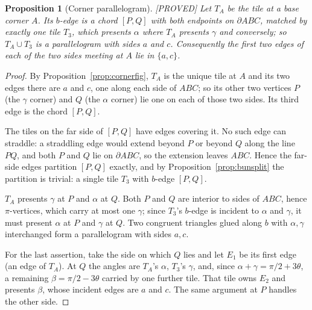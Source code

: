 \documentclass[11pt,reqno]{amsart}
\theoremstyle{plain}
\newtheorem{proposition}[theorem]{Proposition}
\theoremstyle{definition}
\newcommand{\lab}[1]{\hfill\textnormal{\footnotesize\textsc{[#1]}}}
\begin{document}
\begin{proposition}[Corner parallelogram]\label{prop:cornerpara}\lab{PROVED}
Let $T_A$ be the tile at a base corner $A$. Its $b$-edge is a chord $[P,Q]$ with both endpoints on
$\partial ABC$, matched by exactly one tile $T_3$, which presents $\alpha$ where $T_A$ presents
$\gamma$ and conversely; so $T_A\cup T_3$ is a parallelogram with sides $a$ and $c$. Consequently
the first \emph{two} edges of each of the two sides meeting at $A$ lie in $\{a,c\}$.
\end{proposition}

\begin{proof}
By Proposition~\ref{prop:cornerfig}, $T_A$ is the unique tile at $A$ and its two edges there are $a$
and $c$, one along each side of $ABC$; so its other two vertices $P$ (the $\gamma$ corner) and $Q$
(the $\alpha$ corner) lie one on each of those two sides. Its third edge is the chord $[P,Q]$.

The tiles on the far side of $[P,Q]$ have edges covering it. No such edge can straddle: a straddling
edge would extend beyond $P$ or beyond $Q$ along the line $PQ$, and both $P$ and $Q$ lie on
$\partial ABC$, so the extension leaves $ABC$. Hence the far-side edges partition $[P,Q]$ exactly,
and by Proposition~\ref{prop:bunsplit} the partition is trivial: a single tile $T_3$ with $b$-edge
$[P,Q]$.

$T_A$ presents $\gamma$ at $P$ and $\alpha$ at $Q$. Both $P$ and $Q$ are interior to sides of $ABC$,
hence $\pi$-vertices, which carry at most one $\gamma$; since $T_3$'s $b$-edge is incident to
$\alpha$ and $\gamma$, it must present $\alpha$ at $P$ and $\gamma$ at $Q$. Two congruent triangles
glued along $b$ with $\alpha,\gamma$ interchanged form a parallelogram with sides $a,c$.

For the last assertion, take the side on which $Q$ lies and let $E_1$ be its first edge (an edge of
$T_A$). At $Q$ the angles are $T_A$'s $\alpha$, $T_3$'s $\gamma$, and, since
$\alpha+\gamma=\pi/2+3\theta$, a remaining $\beta=\pi/2-3\theta$ carried by one further tile. That
tile owns $E_2$ and presents $\beta$, whose incident edges are $a$ and $c$. The same argument at $P$
handles the other side.
\end{proof}
\end{document}
